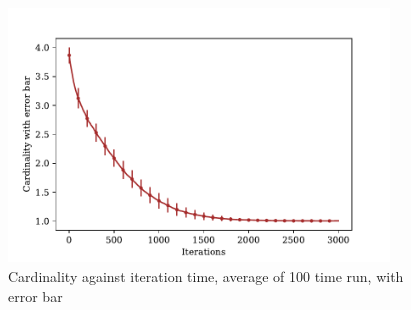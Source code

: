 \documentclass[a4paper,12pt]{article}
\begin{document}
	\begin{figure}[H]
		\centering
		\includegraphics[width=0.9\textwidth]{card_errbarnorm1_200_3000_100}
		\caption{Cardinality against iteration time, average of 100 time run, with error bar}\label{card_errbarnorm1_toss200_3000_100}
	\end{figure}
\end{document}
